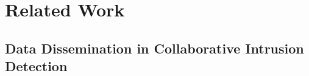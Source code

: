 \documentclass[../../main.tex]{subfiles}
\begin{document}
\chapter{Related Work}
\newpage
\section{Data Dissemination in Collaborative Intrusion Detection}








\end{document}
